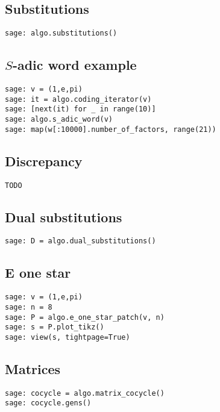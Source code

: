 \begin{refsegment}
\subsection{Substitutions}
\begin{verbatim}
sage: algo.substitutions()
\end{verbatim}
\subsection{$S$-adic word example}
\begin{verbatim}
sage: v = (1,e,pi)
sage: it = algo.coding_iterator(v)
sage: [next(it) for _ in range(10)]
sage: algo.s_adic_word(v)
sage: map(w[:10000].number_of_factors, range(21))  
\end{verbatim}
\subsection{Discrepancy}
\begin{verbatim}
TODO
\end{verbatim}
\subsection{Dual substitutions}
\begin{verbatim}
sage: D = algo.dual_substitutions()
\end{verbatim}
\subsection{E one star}
\begin{verbatim}
sage: v = (1,e,pi)
sage: n = 8
sage: P = algo.e_one_star_patch(v, n)
sage: s = P.plot_tikz()
sage: view(s, tightpage=True)
\end{verbatim}
\subsection{Matrices}
\begin{verbatim}
sage: cocycle = algo.matrix_cocycle()
sage: cocycle.gens()
\end{verbatim}
\end{refsegment}
\printbibliography[segment=8,
heading=subbibliography,
title={References}]
\newpage
